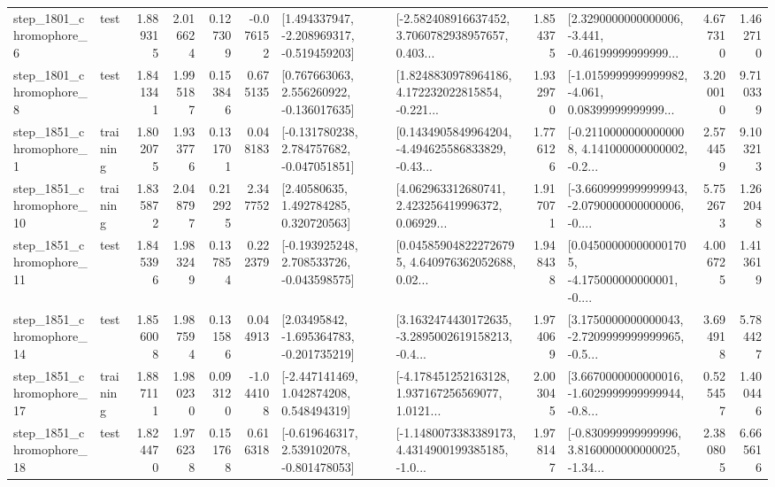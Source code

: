 \begin{tabular}{llrrrrllrlrr}
  step\_1801\_chromophore\_6 &      test &      1.889315 &    2.016624 &      0.127309 & -0.076152 &   [1.494337947, -2.208969317, -0.519459203] &  [-2.582408916637452, 3.7060782938957657, 0.403... &       1.854375 &  [2.3290000000000006, -3.441, -0.46199999999999... &            4.677310 &          1.462710 \\
  step\_1801\_chromophore\_8 &      test &      1.841341 &    1.995187 &      0.153846 &  0.675135 &    [0.767663063, 2.556260922, -0.136017635] &  [1.8248830978964186, 4.172232022815854, -0.221... &       1.932970 &  [-1.0159999999999982, -4.061, 0.08399999999999... &            3.200010 &          9.710339 \\
  step\_1851\_chromophore\_1 &  training &      1.802075 &    1.933776 &      0.131701 &  0.048183 &   [-0.131780238, 2.784757682, -0.047051851] &  [0.1434905849964204, -4.494625586833829, -0.43... &       1.776126 &  [-0.21100000000000008, 4.141000000000002, -0.2... &            2.574459 &          9.103213 \\
 step\_1851\_chromophore\_10 &  training &      1.835872 &    2.048797 &      0.212925 &  2.347752 &      [2.40580635, 1.492784285, 0.320720563] &  [4.062963312680741, 2.423256419996372, 0.06929... &       1.917071 &  [-3.6609999999999943, -2.0790000000000006, -0.... &            5.752673 &          1.262048 \\
 step\_1851\_chromophore\_11 &      test &      1.845396 &    1.983249 &      0.137854 &  0.222379 &   [-0.193925248, 2.708533726, -0.043598575] &  [0.045859048222726795, 4.640976362052688, 0.02... &       1.948438 &  [0.045000000000001705, -4.175000000000001, -0.... &            4.006725 &          1.413619 \\
 step\_1851\_chromophore\_14 &      test &      1.856008 &    1.987594 &      0.131586 &  0.044913 &    [2.03495842, -1.695364783, -0.201735219] &  [3.1632474430172635, -3.2895002619158213, -0.4... &       1.974069 &  [3.1750000000000043, -2.7209999999999965, -0.5... &            3.694918 &          5.784427 \\
 step\_1851\_chromophore\_17 &  training &      1.887111 &    1.980230 &      0.093120 & -1.044108 &    [-2.447141469, 1.042874208, 0.548494319] &  [-4.178451252163128, 1.937167256569077, 1.0121... &       2.003045 &  [3.6670000000000016, -1.6029999999999944, -0.8... &            0.525457 &          1.400446 \\
 step\_1851\_chromophore\_18 &      test &      1.824470 &    1.976238 &      0.151768 &  0.616318 &   [-0.619646317, 2.539102078, -0.801478053] &  [-1.1480073383389173, 4.4314900199385185, -1.0... &       1.978147 &  [-0.830999999999996, 3.8160000000000025, -1.34... &            2.380805 &          6.665616 \\

\end{tabular}
